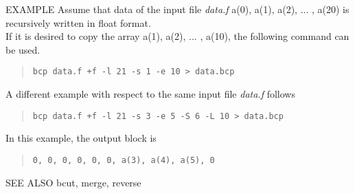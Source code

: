 \begin{qsection}{EXAMPLE}
Assume that data of the input file {\em data.f}
{a(0), a(1), a(2), ... , a(20)} is recursively written in float format.\\
If it is desired to copy the array {a(1), a(2), ... , a(10)}, 
the following command can be used.
\begin{quote}
\verb!bcp data.f +f -l 21 -s 1 -e 10 > data.bcp!
\end{quote}

\par
A different example with respect to the same input file {\em data.f}
follows

\begin{quote}
\verb!bcp data.f +f -l 21 -s 3 -e 5 -S 6 -L 10 > data.bcp!
\end{quote}

In this example, the output block is
\begin{quote}
\verb!0, 0, 0, 0, 0, 0, a(3), a(4), a(5), 0!
\end{quote}
\end{qsection}

\begin{qsection}{SEE ALSO}
bcut, merge, reverse
\end{qsection}
